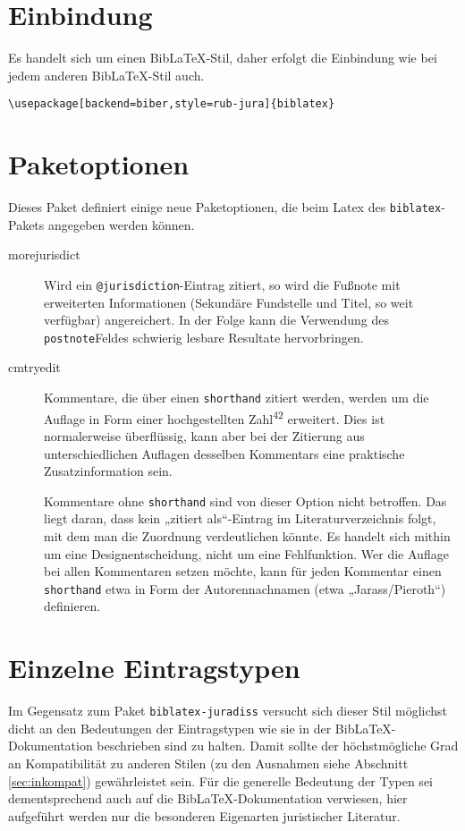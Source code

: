 \documentclass[11pt,a4paper,DIV=calc]{scrartcl}
\newcommand\software[1]{\textsf{#1}}
\newcommand\Biblatex{\software{Bib\LaTeX{}}\xspace}
\begin{document}
\section{Einbindung}

Es handelt sich um einen \Biblatex-Stil, daher erfolgt die Einbindung
wie bei jedem anderen \Biblatex-Stil auch.

\begin{verbatim}
\usepackage[backend=biber,style=rub-jura]{biblatex}
\end{verbatim}

\section{Paketoptionen}

Dieses Paket definiert einige neue Paketoptionen, die beim Latex des
\verb+biblatex+-Pakets angegeben werden können.

\begin{description}
\item[morejurisdict] Wird ein \verb+@jurisdiction+-Eintrag zitiert, so
  wird die Fußnote mit erweiterten Informationen (Sekundäre Fundstelle
  und Titel, so weit verfügbar) angereichert. In der Folge kann die
  Verwendung des \verb+postnote+Feldes schwierig lesbare Resultate
  hervorbringen.
\item[cmtryedit] Kommentare, die über einen \verb+shorthand+ zitiert
  werden, werden um die Auflage in Form einer hochgestellten
  Zahl\textsuperscript{42} erweitert. Dies ist normalerweise
  überflüssig, kann aber bei der Zitierung aus unterschiedlichen
  Auflagen desselben Kommentars eine praktische Zusatzinformation
  sein.

  Kommentare ohne \verb+shorthand+ sind von dieser Option nicht
  betroffen. Das liegt daran, dass kein „zitiert als“-Eintrag im
  Literaturverzeichnis folgt, mit dem man die Zuordnung verdeutlichen
  könnte. Es handelt sich mithin um eine Designentscheidung, nicht um
  eine Fehlfunktion. Wer die Auflage bei allen Kommentaren setzen
  möchte, kann für jeden Kommentar einen \verb+shorthand+ etwa in Form
  der Autorennachnamen (etwa „Jarass/Pieroth“) definieren.
\end{description}

\section{Einzelne Eintragstypen}

Im Gegensatz zum Paket \verb+biblatex-juradiss+ versucht sich dieser
Stil möglichst dicht an den Bedeutungen der Eintragstypen wie sie in
der \Biblatex-Do\-ku\-men\-ta\-tion beschrieben sind zu halten. Damit sollte
der höchstmögliche Grad an Kompatibilität zu anderen Stilen (zu den
Ausnahmen siehe Abschnitt \ref{sec:inkompat}) gewährleistet sein. Für
die generelle Bedeutung der Typen sei dementsprechend auch auf die
\Biblatex-Do\-ku\-men\-ta\-tion verwiesen, hier aufgeführt werden nur die
besonderen Eigenarten juristischer Literatur.
\end{document}
